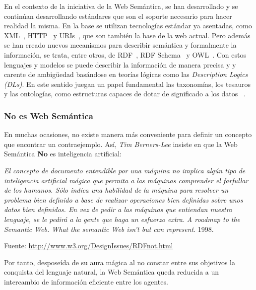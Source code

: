 En el contexto de la iniciativa de la Web Semántica, se han desarrollado y se continúan
desarrollando estándares que son el soporte necesario para hacer realidad la misma.
En la base se utilizan tecnologías estándar ya asentadas, como \gls{XML}~\cite{XML11}, \gls{HTTP}~\cite{http-rfc} y \gls{URI}s~\cite{uri-rfc},
que son también la base de la web actual. Pero además se han creado nuevos mecanismos
para describir semántica y formalmente la información, se trata, entre otros, de \gls{RDF}~\cite{RDF}, \gls{RDF Schema}~\cite{RDFS} y \gls{OWL}~\cite{OWL11,owl2-primer}. Con estos lenguajes y modelos se puede describir la información de manera precisa y
y carente de ambig\"{u}edad basándose en teorías lógicas como las \textit{Description Logics~\cite{baader03description} (\gls{DL}s)}.
En este sentido juegan un papel fundamental las taxonomías, los tesauros y las ontologías,
como estructuras capaces de dotar de significado a los datos 
~\cite{Benjamins98knowledgemanagement}.

\subsubsection{No es Web Semántica}
En muchas ocasiones, no existe manera más conveniente para definir un concepto que encontrar
un contraejemplo. Así, \textit{Tim Berners-Lee} insiste en que la Web Semántica \textbf{No} es inteligencia artificial: 
\begin{Frame}
\textit{El concepto de documento entendible por una máquina no implica algún tipo de
inteligencia artificial mágica que permita a las máquinas comprender el
farfullar de los humanos. Sólo indica una habilidad de la máquina para resolver
un problema bien definido a base de realizar operaciones bien definidas sobre
unos datos bien definidos. En vez de pedir a las máquinas que entiendan nuestro
lenguaje, se le pedirá a la gente que haga un esfuerzo extra.} \textit{A roadmap
to the Semantic Web.  What the semantic Web isn't but can represent}. 1998. 

Fuente: \url{http://www.w3.org/DesignIssues/RDFnot.html}
\end{Frame}

Por tanto, desposeída de su aura mágica al no constar entre sus objetivos la
conquista del lenguaje natural, la Web Semántica queda reducida a un intercambio
de información eficiente entre los agentes.
